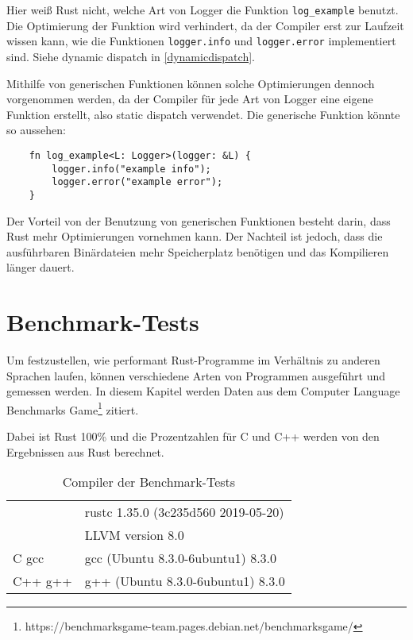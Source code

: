 Hier weiß Rust nicht, welche Art von Logger die Funktion \verb"log_example" benutzt. Die Optimierung der Funktion wird verhindert, da der Compiler erst zur Laufzeit wissen kann, wie die Funktionen \verb"logger.info" und \verb"logger.error" implementiert sind. Siehe \glqq dynamic dispatch\grqq{} in \autoref{dynamicdispatch}.

Mithilfe von generischen Funktionen können solche Optimierungen dennoch vorgenommen werden, da der Compiler für jede Art von Logger eine eigene Funktion erstellt, also \glqq static dispatch\grqq{} verwendet. Die generische Funktion könnte so aussehen:

\begin{lstlisting}
    fn log_example<L: Logger>(logger: &L) {
        logger.info("example info");
        logger.error("example error");
    }
\end{lstlisting}

Der Vorteil von der Benutzung von generischen Funktionen besteht darin, dass Rust mehr Optimierungen vornehmen kann. Der Nachteil ist jedoch, dass die ausführbaren Binärdateien mehr Speicherplatz benötigen und das Kompilieren länger dauert.


\section{Benchmark-Tests}

Um festzustellen, wie performant Rust-Programme im Verhältnis zu anderen Spra\-chen laufen, können verschiedene Arten von Programmen ausgeführt und ge\-mes\-sen werden. In diesem Kapitel werden Daten aus dem Computer Language Benchmarks Game\footnote{https://benchmarksgame-team.pages.debian.net/benchmarksgame/} zitiert.

Dabei ist Rust 100\% und die Prozentzahlen für C und C++ werden von den Ergebnissen aus Rust berechnet.

\hspace{1cm}

\begin{table}[htbp]
\centering
\begin{tabular}{|l|l|}
\hline
\rule[-1ex]{0pt}{2.5ex} \multirow{2}{*}{Rust} & rustc 1.35.0 (3c235d560 2019-05-20) \\ & LLVM version 8.0 \\
\hline
\rule[-1ex]{0pt}{2.5ex} C gcc & gcc (Ubuntu 8.3.0-6ubuntu1) 8.3.0 \\
\hline
\rule[-1ex]{0pt}{2.5ex} C++ g++ & g++ (Ubuntu 8.3.0-6ubuntu1) 8.3.0 \\
\hline
\end{tabular}
\caption{Compiler der Benchmark-Tests}
\end{table}

